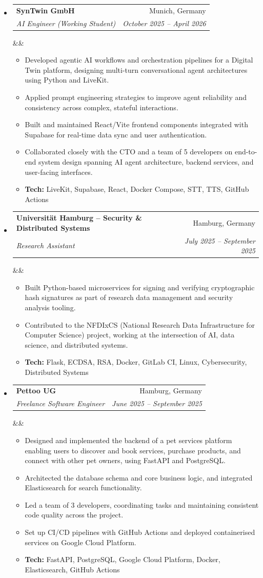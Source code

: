 \documentclass[a4paper,11pt]{article}
\makeatletter
\newcommand{\cvitem}[1]{\item\small{#1}}
\newcommand{\cvsubheading}[5][]{%
  \vspace{2pt}%
  \hbadness=10000%
  \begin{tabular*}{\textwidth}[t]{@{}l@{\extracolsep{\fill}}r@{}}
    \textbf{#2} & #3 \\
    \textit{\small #4} & \textit{\small #5} \\
  \end{tabular*}%
  \ifx&#1&\else\vspace{2pt}\\{\small #1}\fi%
  \vspace{-4pt}%
}
\newenvironment{cvitemlist}
  {\begin{itemize}[leftmargin=0.4cm, topsep=1pt, itemsep=0pt, parsep=0pt, label=\textbullet]}
  {\end{itemize}}
\newenvironment{cvsection}
  {\begin{itemize}[leftmargin=0cm, label={}, topsep=0pt, itemsep=-2pt]}
  {\end{itemize}}
\makeatother
\begin{document}
\begin{cvsection}
  \item
  \cvsubheading
    {SynTwin GmbH}{Munich, Germany}
    {AI Engineer (Working Student)}{October 2025 -- April 2026}
  \begin{cvitemlist}
    \cvitem{Developed agentic AI workflows and orchestration pipelines for a Digital Twin platform, designing multi-turn conversational agent architectures using Python and LiveKit.}
    \cvitem{Applied prompt engineering strategies to improve agent reliability and consistency across complex, stateful interactions.}
    \cvitem{Built and maintained React/Vite frontend components integrated with Supabase for real-time data sync and user authentication.}
    \cvitem{Collaborated closely with the CTO and a team of 5 developers on end-to-end system design spanning AI agent architecture, backend services, and user-facing interfaces.}
    \cvitem{\textbf{Tech:} LiveKit, Supabase, React, Docker Compose, STT, TTS, GitHub Actions}
  \end{cvitemlist}

  \item
  \cvsubheading
    {Universität Hamburg -- Security \& Distributed Systems}{Hamburg, Germany}
    {Research Assistant}{July 2025 -- September 2025}
  \begin{cvitemlist}
    \cvitem{Built Python-based microservices for signing and verifying cryptographic hash signatures as part of research data management and security analysis tooling.}
    \cvitem{Contributed to the NFDIxCS (National Research Data Infrastructure for Computer Science) project, working at the intersection of AI, data science, and distributed systems.}
    \cvitem{\textbf{Tech:} Flask, ECDSA, RSA, Docker, GitLab CI, Linux, Cybersecurity, Distributed Systems}
  \end{cvitemlist}

  \item
  \cvsubheading
    {Pettoo UG}{Hamburg, Germany}
    {Freelance Software Engineer}{June 2025 -- September 2025}
  \begin{cvitemlist}
    \cvitem{Designed and implemented the backend of a pet services platform enabling users to discover and book services, purchase products, and connect with other pet owners, using FastAPI and PostgreSQL.}
    \cvitem{Architected the database schema and core business logic, and integrated Elasticsearch for search functionality.}
    \cvitem{Led a team of 3 developers, coordinating tasks and maintaining consistent code quality across the project.}
    \cvitem{Set up CI/CD pipelines with GitHub Actions and deployed containerised services on Google Cloud Platform.}
    \cvitem{\textbf{Tech:} FastAPI, PostgreSQL, Google Cloud Platform, Docker, Elasticsearch, GitHub Actions}
  \end{cvitemlist}


\end{cvsection}
\end{document}
